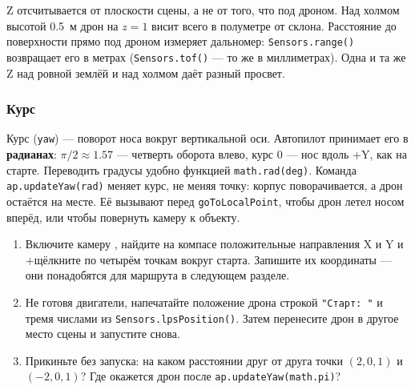 Z отсчитывается от плоскости сцены, а не от того, что под дроном. Над холмом высотой 0.5~м дрон на $z = 1$ висит всего в полуметре от склона. Расстояние до поверхности прямо под дроном измеряет дальномер: \verb|Sensors.range()| возвращает его в метрах (\verb|Sensors.tof()| --- то же в миллиметрах). Одна и та же Z над ровной землёй и над холмом даёт разный просвет.

\subsubsection*{Курс}

Курс (\texttt{yaw}) --- поворот носа вокруг вертикальной оси. Автопилот принимает его в \textbf{радианах}: $\pi/2 \approx 1.57$ --- четверть оборота влево, курс 0 --- нос вдоль +Y, как на старте. Переводить градусы удобно функцией \verb|math.rad(deg)|. Команда \verb|ap.updateYaw(rad)| меняет курс, не меняя точку: корпус поворачивается, а дрон остаётся на месте. Её вызывают перед \verb|goToLocalPoint|, чтобы дрон летел носом вперёд, или чтобы повернуть камеру к объекту.

\begin{taskbox}
\begin{enumerate}
  \item Включите камеру , найдите на компасе положительные направления X и Y и +щёлкните по четырём точкам вокруг старта. Запишите их координаты --- они понадобятся для маршрута в следующем разделе.
  \item Не готовя двигатели, напечатайте положение дрона строкой \verb|"Старт: "| и тремя числами из \verb|Sensors.lpsPosition()|. Затем перенесите дрон в другое место сцены и запустите снова.
  \item Прикиньте без запуска: на каком расстоянии друг от друга точки $(2, 0, 1)$ и $(-2, 0, 1)$? Где окажется дрон после \verb|ap.updateYaw(math.pi)|?
\end{enumerate}
\end{taskbox}
